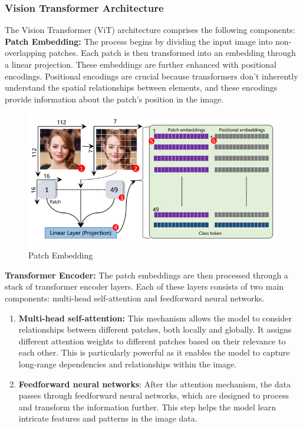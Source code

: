 \subsubsection{Vision Transformer Architecture}

\noindent The Vision Transformer (ViT) architecture comprises the following components:
\\

\noindent \textbf{Patch Embedding:} The process begins by dividing the input image into non-overlapping patches. Each patch is then transformed into an embedding through a linear projection. These embeddings are further enhanced with positional encodings. Positional encodings are crucial because transformers don't inherently understand the spatial relationships between elements, and these encodings provide information about the patch's position in the image.
\\
\begin{figure}[h]
    \centering
    \includegraphics[width=6in]{img/patchembedding.jpg}
    \caption{Patch Embedding}
\end{figure}

\noindent \textbf{Transformer Encoder:} The patch embeddings are then processed through a stack of transformer encoder layers. Each of these layers consists of two main components: multi-head self-attention and feedforward neural networks.

\begin{enumerate}
    \item \textbf{Multi-head self-attention:} This mechanism allows the model to consider relationships between different patches, both locally and globally. It assigns different attention weights to different patches based on their relevance to each other. This is particularly powerful as it enables the model to capture long-range dependencies and relationships within the image.

    \item \textbf{Feedforward neural networks}: After the attention mechanism, the data passes through feedforward neural networks, which are designed to process and transform the information further. This step helps the model learn intricate features and patterns in the image data.
\end{enumerate}

